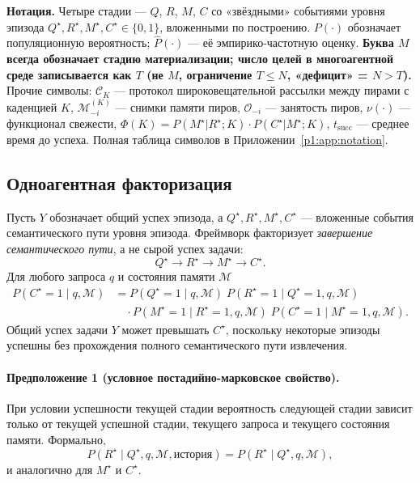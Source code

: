 \documentclass{article}
\begin{document}
\textbf{Нотация.} Четыре стадии --- $Q$, $R$, $M$, $C$ со «звёздными» событиями уровня эпизода $Q^\star,R^\star,M^\star,C^\star\!\in\!\{0,1\}$, вложенными по построению. $P(\cdot)$ обозначает популяционную вероятность; $\hat{P}(\cdot)$ --- её эмпирико-частотную оценку. \textbf{Буква $M$ всегда обозначает стадию материализации; число целей в многоагентной среде записывается как $T$ (не $M$, ограничение $T{\le}N$, «дефицит» = $N{>}T$).} Прочие символы: $\mathcal{C}_K$ --- протокол широковещательной рассылки между пирами с каденцией $K$, $\mathcal{M}_{-i}^{(K)}$ --- снимки памяти пиров, $\mathcal{O}_{-i}$ --- занятость пиров, $\nu(\cdot)$ --- функционал свежести, $\Phi(K){=}P(M^\star|R^\star;K)\!\cdot\!P(C^\star|M^\star;K)$, $t_{\mathrm{succ}}$ --- среднее время до успеха. Полная таблица символов в Приложении~\ref{p1:app:notation}.

\subsection{Одноагентная факторизация}
\label{p1:sec:single-theory}

Пусть $Y$ обозначает общий успех эпизода, а
$Q^\star, R^\star, M^\star, C^\star$ --- вложенные события семантического пути
уровня эпизода. Фреймворк факторизует \emph{завершение семантического
пути}, а не сырой успех задачи:
\[
Q^\star \rightarrow R^\star \rightarrow M^\star \rightarrow C^\star.
\]
Для любого запроса $q$ и состояния памяти $\mathcal{M}$
\begin{align*}
P(C^\star = 1 \mid q, \mathcal{M})
&=
P(Q^\star = 1 \mid q, \mathcal{M})\;
P(R^\star = 1 \mid Q^\star = 1, q, \mathcal{M}) \\
&\quad \cdot
P(M^\star = 1 \mid R^\star = 1, q, \mathcal{M})\;
P(C^\star = 1 \mid M^\star = 1, q, \mathcal{M}).
\end{align*}
Общий успех задачи $Y$ может превышать $C^\star$, поскольку некоторые эпизоды
успешны без прохождения полного семантического пути извлечения.

\paragraph{Предположение 1 (условное постадийно-марковское свойство).}
При условии успешности текущей стадии вероятность
следующей стадии зависит только от текущей успешной стадии,
текущего запроса и текущего состояния памяти. Формально,
\[
P(R^\star \mid Q^\star, q, \mathcal{M}, \text{история}) = P(R^\star \mid Q^\star, q, \mathcal{M}),
\]
и аналогично для $M^\star$ и $C^\star$.
\end{document}
